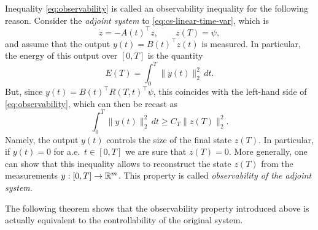 \begin{remark}
    Inequality \eqref{eq:observability} is called an observability inequality for the following reason. Consider the \emph{adjoint system} to \eqref{eq:cs-linear-time-var}, which is
    \begin{equation}
        \dot z = -A(t)^\top  z, \qquad z(T) = \psi,
    \end{equation}
    and assume that the output $y(t) = B(t)^\top z(t)$ is measured.
    In particular, the energy of this output over $[0,T]$ is the quantity
    \begin{equation}
        E(T) = \int_0^T \|y(t)\|_2^2\, dt.
    \end{equation}
    But, since $y(t) = B(t)^\top R(T,t)^\top \psi$, this coincides with the left-hand side of \eqref{eq:observability}, which can then be recast as
    \begin{equation}
        \int_0^T \|y(t)\|_2^2 \, dt \ge C_T \|z(T)\|_2^2.
    \end{equation}
    Namely, the output $y(t)$ controls the size of the final state $z(T)$.
    In particular, if $y(t)= 0$ for a.e.~$t\in [0,T]$ we are sure that $z(T)=0$.
    More generally, one can show that this inequality allows to reconstruct the state $z(T)$ from the measurements $y:[0,T]\to \mathbb{R}^m$.
% 
    This property is called \emph{observability of the adjoint system}. 
\end{remark}

The following theorem shows that the observability property introduced above is actually equivalent to the controllability of the original system.


